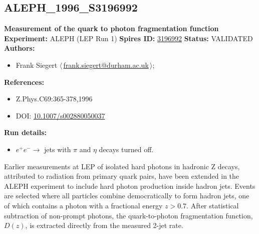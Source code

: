 \clearpage


\clearpage

\subsection{ALEPH\_1996\_S3196992}
\textbf{Measurement of the quark to photon fragmentation function}\newline
\textbf{Experiment:} ALEPH (LEP Run 1) \newline
\textbf{Spires ID:} \href{http://www.slac.stanford.edu/spires/find/hep/www?rawcmd=key+3196992}{3196992}\newline
\textbf{Status:} VALIDATED\newline
\textbf{Authors:}
\begin{itemize}
  \item Frank Siegert $\langle\,$\href{mailto:frank.siegert@durham.ac.uk}{frank.siegert@durham.ac.uk}$\,\rangle$;
\end{itemize}
\textbf{References:}
\begin{itemize}
  \item Z.Phys.C69:365-378,1996
  \item DOI: \href{http://dx.doi.org/10.1007/s002880050037}{10.1007/s002880050037}
\end{itemize}
\textbf{Run details:}
\begin{itemize}

  \item $e^+e^-\to$ jets with $\pi$ and $\eta$ decays turned off.\end{itemize}

\noindent Earlier measurements at LEP of isolated hard photons in hadronic Z decays, attributed to radiation from primary quark pairs, have been extended in the ALEPH experiment to include hard photon production inside hadron jets. Events are selected where all particles combine democratically to form hadron jets, one of which contains a photon with a fractional energy $z > 0.7$. After  statistical subtraction of non-prompt photons, the quark-to-photon fragmentation function, $D(z)$, is extracted directly from the measured 2-jet rate.

\clearpage


\clearpage

